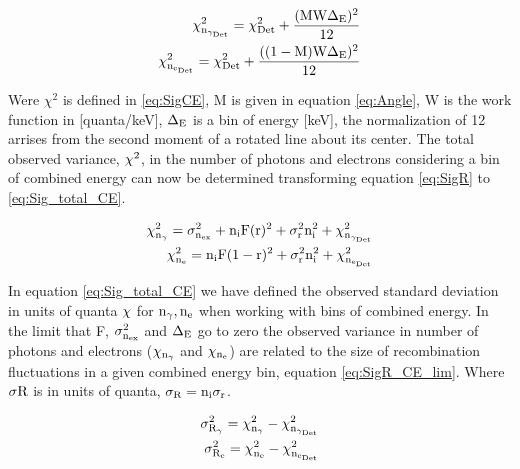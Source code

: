 \begin{equation}
\begin{split}
\rm \chi_{n_{\gamma_{Det}}}^2= \chi_{Det}^2 + \frac{(MW\Delta_E)^2}{12}\\
\rm \chi_{n_{e_{Det}}}^2= \chi_{Det}^2 + \frac{((1-M)W\Delta_E)^2}{12}\\
\label{eq:SigCE_2}
\end{split}
\end{equation}



Were $\chi^2$ is defined in \ref{eq:SigCE}, M is given in equation \ref{eq:Angle}, W is the work function in [quanta/keV], $\rm \Delta_E$ is a bin of energy [keV], the normalization of 12 arrises from the second moment of a rotated line about its center. The total observed variance, $\rm \chi^2$, in the number of photons and electrons considering a bin of combined energy can now be determined transforming equation \ref{eq:SigR} to \ref{eq:Sig_total_CE}.

 
\begin{equation}
\begin{split}
\rm \chi_{n_\gamma}^2 = \sigma_{n_{ex}}^2 + n_iF(r)^2 + \sigma_{r}^2 n_i^2 + \chi_{n_{\gamma_{Det}}}^2 \\
\rm \chi_{n_e}^2  = n_iF(1-r)^2 + \sigma_{r}^2 n_i^2 + \chi_{n_{e_{Det}}}^2
\label{eq:Sig_total_CE}
\end{split}
\end{equation}


In equation \ref{eq:Sig_total_CE} we have defined the observed standard deviation in units of quanta $\rm \chi$ for $\rm n_\gamma, n_e$ when working with bins of combined energy. In the limit that F, $\rm \sigma_{n_{ex}}^2$ and $\rm \Delta_E$ go to zero the observed variance in number of photons and electrons ($\rm \chi_{n_\gamma}$ and $\rm \chi_{n_e}$) are related to the size of recombination fluctuations in a given combined energy bin, equation \ref{eq:SigR_CE_lim}. Where $\rm \sigma R$ is in units of quanta, $\rm \sigma_R = n_i\sigma_r$.

\begin{equation}
\begin{split}
\rm \sigma_{R_\gamma}^2 = \chi_{n_\gamma}^2 - \chi_{n_{\gamma_{Det}}}^2  \\
\rm \sigma_{R_e}^2 = \chi_{n_e}^2 - \chi_{n_{e_{Det}}}^2
\label{eq:SigR_CE_lim}
\end{split}
\end{equation}

